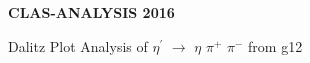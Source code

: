 \begin{center}
{\large\bf  CLAS-ANALYSIS 2016}
\end{center}
\vspace*{.8cm}
\begin{center}
{ Dalitz Plot Analysis of $\eta^{\prime}$ $\rightarrow$ $\eta$ $\pi^{+}$ $\pi^{-}$ from g12}
\end{center}

\vspace*{.6cm}
\vspace*{.8cm}
\vspace{3cm}
\vspace{.8cm}
\begin{center}\large\bfseries

\end{center}
\vspace*{.5cm}



